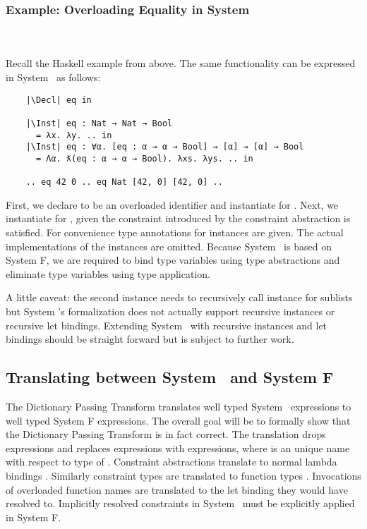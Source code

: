 \subsubsection{Example: Overloading Equality in System \Fo}\hfill\\\\
Recall the Haskell example from above. The same functionality can be expressed in System \Fo\ as follows: 
\begin{verbatim}
    |\Decl| eq in

    |\Inst| eq : Nat → Nat → Bool 
      = λx. λy. .. in
    |\Inst| eq : ∀α. [eq : α → α → Bool] ⇒ [α] → [α] → Bool 
      = Λα. ƛ(eq : α → α → Bool). λxs. λys. .. in

    .. eq 42 0 .. eq Nat [42, 0] [42, 0] .. 
\end{verbatim}
First, we declare  to be an overloaded identifier and instantiate  for . 
Next, we instantiate  for \inl{[α]}, given the constraint introduced by the constraint abstraction  is satisfied.  
For convenience type annotations for instances are given. 
The actual implementations of the instances are omitted.
Because System \Fo\ is based on System F, we are required to bind type variables using type abstractions  and eliminate type variables using type application. 

\noindent A little caveat: the second instance needs to recursively call instance  for sublists but System \Fo's formalization does not actually support recursive instances or recursive let bindings. Extending System \Fo\ with recursive instances and let bindings should be straight forward but is subject to further work.
\subsection{Translating between System \Fo\ and System F}
The Dictionary Passing Transform translates well typed System \Fo\ expressions to well typed System F expressions. 
The overall goal will be to formally show that the Dictionary Passing Transform is in fact correct.
The translation drops  expressions and replaces  expressions with  expressions, where  is an unique name with respect to type  of . 
Constraint abstractions  translate to normal lambda bindings . Similarly constraint types  are translated to function types . 
Invocations of overloaded function names are translated to the let binding they would have resolved to.
Implicitly resolved constraints in System \Fo\ must be explicitly applied in System F.
